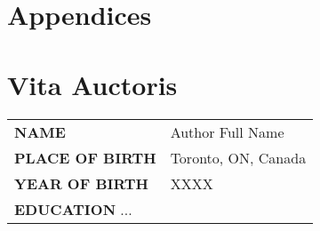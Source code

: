\appendix
\addappheadtotoc
\chapter*{Appendices}





\clearpage


\clearpage

\chapter*{Vita Auctoris} %

\begin{tabular}{ll}
	\textbf{NAME}\hspace{4cm} & Author Full Name\\[0.5cm] 
	\textbf{PLACE OF BIRTH} & Toronto, ON, Canada\\[0.5cm]
	\textbf{YEAR OF BIRTH} & XXXX\\[0.5cm] 
	\textbf{EDUCATION}
	...
\end{tabular}